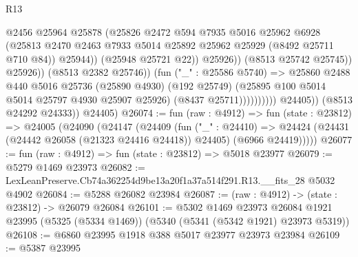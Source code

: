 \begin{lexlean}{R13}
\begin{coremodule}
                                            @2456
                                            @25964
                                            @25878
                                            (@25826
                                              @2472
                                              @594
                                              @7935
                                              @5016
                                              @25962
                                              @6928
                                              (@25813
                                                @2470
                                                @2463
                                                @7933
                                                @5014
                                                @25892
                                                @25962
                                                @25929
                                                (@8492 @25711 @710 @84))
                                              @25944))
                                          (@25948 @25721 @22))
                                        @25926))
                                    (@8513 @25742 @25745))
                                  @25926))
                              (@8513 @2382 @25746))
                            (fun ("_" : @25586 @5740) =>
                            @25860
                              @2488
                              @440
                              @5016
                              @25736
                              (@25890 @4930)
                              (@192 @25749)
                              (@25895 @100 @5014 @5014 @25797 @4930 @25907 @25926)
                              (@8437 @25711))))))))))
            @24405))
        (@8513 @24292 @24333))
      @24405)
@26074 := fun (raw : @4912) =>
  fun (state : @23812) =>
  @24005
    (@24090
      (@24147
        (@24409
          (fun ("_" : @24410) =>
          @24424 (@24431 (@24442 @26058 (@21323 @24416 @24418)) @24405) (@6966 @24419)))))
@26077 := fun (raw : @4912) => fun (state : @23812) => @5018 @23977
@26079 := @5279 @1469 @23973
@26082 := LexLeanPreserve.Cb74a362254d9be13a20f1a37a514f291.R13.__fits_28 @5032 @4902
@26084 := @5288 @26082 @23984
@26087 := (raw : @4912) -> (state : @23812) -> @26079 @26084
@26101 := @5302
    @1469
    @23973
    @26084
    @1921
    @23995
    (@5325 (@5334 @1469))
    (@5340 (@5341 (@5342 @1921) @23973 @5319))
@26108 := @6860 @23995 @1918 @388 @5017 @23977 @23973 @23984
@26109 := @5387 @23995

\end{coremodule}
\end{lexlean}
